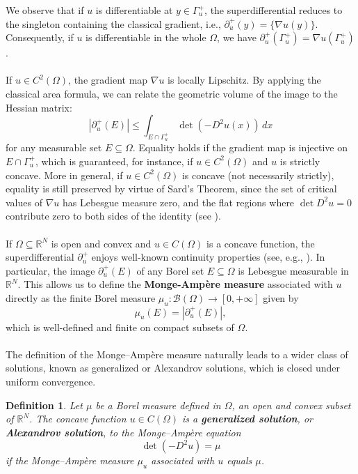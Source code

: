 \documentclass[10pt,a4paper]{amsart}
\newtheorem{definition}[theorem]{Definition}
\numberwithin{equation}{section}
\begin{document}
 
\noindent We observe that if $u$ is differentiable at $y \in \Gamma_u^+$, the superdifferential reduces to the singleton containing the classical gradient, i.e., $\partial^+_u(y)=\{\nabla u(y)\}$. Consequently, if $u$ is differentiable in the whole $\Omega$, we have $\partial^+_u(\Gamma_u^+) = \nabla u(\Gamma_u^+)$.
\\ \\
\noindent If $u \in C^{2}(\Omega)$, the gradient map $\nabla u$ is locally Lipschitz. By applying the classical area formula, we can relate the geometric volume of the image to the Hessian matrix:
    \begin{equation}\label{eq:area}
    |\partial^+_u(E)| \leq \int_{E \cap \Gamma_u^+} \det(-D^2 u(x)) \, dx
    \end{equation}
    for any measurable set $E \subseteq \Omega$. Equality holds if the gradient map is injective on $E \cap \Gamma_u^+$, which is guaranteed, for instance, if $u \in C^2(\Omega)$ and $u$ is strictly concave. More in general, if $u \in C^2(\Omega)$ is concave (not necessarily strictly), equality is still preserved by virtue of Sard's Theorem, since the set of critical values of $\nabla u$ has Lebesgue measure zero, and the flat regions where $\det D^2 u = 0$ contribute zero to both sides of the identity (see \cite{gutierrez2016}). 
    \\ \\
    \noindent  If $\Omega \subseteq \mathbb{R}^N$ is open and convex and $u \in C(\Omega)$ is a concave function, the superdifferential $\partial^+_u$ enjoys well-known continuity properties (see, e.g., \cite{gutierrez2016}).
   In particular, the image $\partial^+_u(E)$ of any Borel set $E \subseteq \Omega$ is Lebesgue measurable in $\mathbb{R}^N$. This allows us to define the \textbf{Monge-Ampère measure} associated with $u$ directly as the finite Borel measure $\mu_u : \mathcal{B}(\Omega) \longrightarrow [0, +\infty]$ given by
\begin{equation}\label{def:Monge}
\mu_u(E) = |\partial^+_u(E)|,
\end{equation}
which is well-defined and finite on compact subsets of $\Omega$.
\\ \\
The definition of the Monge–Ampère measure naturally leads to a wider class of solutions, known as generalized or Alexandrov solutions, which is closed under uniform convergence.
\begin{definition}
    Let $\mu$ be a Borel measure defined in $\Omega$, an open and convex subset 
of $\mathbb{R}^N$. The concave function $u \in C(\Omega)$ is a \textbf{generalized 
solution}, or \textbf{Alexandrov solution}, to the Monge–Ampère equation
$$\det (-D^2u) = \mu$$
if the Monge–Ampère measure $\mu_u$ associated with $u$ equals $\mu$.
\end{definition}
\end{document}
